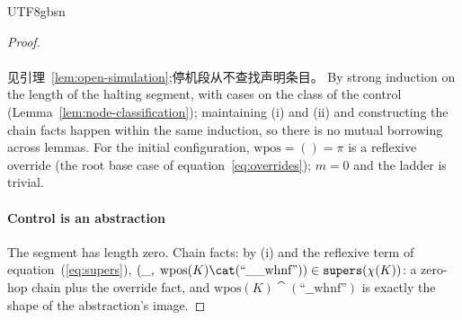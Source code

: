 \begin{CJK*}{UTF8}{gbsn}
\begin{proof}
  \paragraph{}
  见引理~\ref{lem:open-simulation};停机段从不查找声明条目。
\else
  By strong induction on the length of the halting segment, with
  cases on the class of the control
  (Lemma~\ref{lem:node-classification}); maintaining (i) and (ii)
  and constructing the chain facts happen within the same induction,
  so there is no mutual borrowing across lemmas.
  For the initial configuration, $\mathrm{wpos} = () = \pi$ is a
  reflexive override (the root base case of
  equation~\ref{eq:overrides}); $m = 0$ and the ladder is trivial.

  \paragraph{Control is an abstraction}
  The segment has length zero. Chain facts: by (i) and the reflexive
  term of equation~(\ref{eq:supers}),
  $(\_,\; \mathrm{wpos}(K) \cat (\text{``\_\_whnf''})) \in
  \supers(\chi(K))$: a zero-hop chain plus the override fact, and
  $\mathrm{wpos}(K) \cat (\text{``\_\_whnf''})$ is exactly the shape of
  the abstraction's image.


\end{proof}
\end{CJK*}
